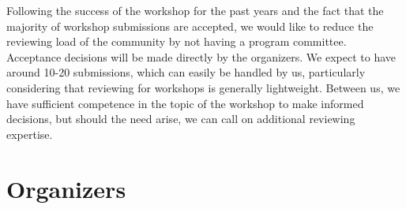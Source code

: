 \documentclass[10pt]{article}
\begin{document}
Following the success of the workshop for the past years and the fact
that the majority of workshop submissions are accepted, we would like to reduce
the reviewing load of the community by not having a program
committee. Acceptance decisions will be made directly by the
organizers. We expect to have around 10-20 submissions, which can
easily be handled by us, particularly considering that reviewing for
workshops is generally lightweight. Between us, we have sufficient
competence in the topic of the workshop to make informed decisions,
but should the need arise, we can call on additional reviewing
expertise.

\section*{Organizers}
\end{document}
